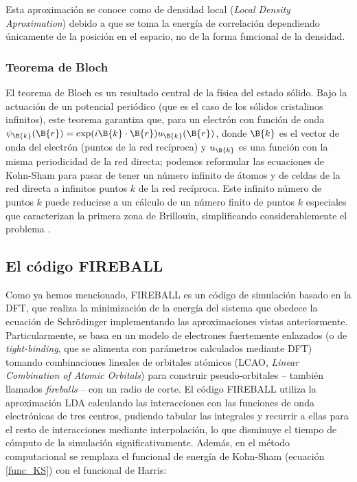 Esta aproximación se conoce como de densidad local (\emph{Local Density Aproximation}) debido a que se toma la energía de correlación dependiendo únicamente de la posición en el espacio, no de la forma funcional de la densidad. 
\subsubsection{Teorema de Bloch}
El teorema de Bloch es un resultado central de la física del estado sólido. Bajo la actuación de un potencial periódico (que es el caso de los sólidos cristalinos infinitos), este teorema garantiza que, para un electrón con función de onda $\psi_\B{k} (\B{r}) = \exp(i\B{k}\cdot \B{r}) u_\B{k}(\B{r})$, donde $\B{k}$ es el vector de onda del electrón (puntos de la red recíproca) y $u_\B{k}$ es una función con la misma periodicidad de la red directa; podemos reformular las ecuaciones de Kohn-Sham para pasar de tener un número infinito de átomos y de celdas de la red directa a infinitos puntos $k$ de la red recíproca. Este infinito número de puntos $k$ puede reducirse a un cálculo de un número finito de puntos $k$ especiales que caracterizan la primera zona de Brillouin, simplificando considerablemente el problema \cite{Baldereschi} \cite{Monkhorst}.
\subsection{El código FIREBALL}
Como ya hemos mencionado, FIREBALL es un código de simulación basado en la DFT, que realiza la minimización de la energía del sistema que obedece la ecuación de Schrödinger implementando las aproximaciones vistas anteriormente. Particularmente, se basa en un modelo de electrones fuertemente enlazados (o de \emph{tight-binding}, que se alimenta con parámetros calculados mediante DFT) tomando combinaciones lineales de orbitales atómicos (LCAO, \emph{Linear Combination of Atomic Orbitals}) para construir pseudo-orbitales -- también llamados \emph{fireballs} -- con un radio de corte. El código FIREBALL utiliza la aproximación LDA calculando las interacciones con las funciones de onda electrónicas de tres centros, pudiendo tabular las integrales y recurrir a ellas para el resto de interacciones mediante interpolación, lo que disminuye el tiempo de cómputo de la simulación significativamente. Además, en el método computacional se remplaza el funcional de energía de Kohn-Sham (ecuación \ref{func_KS}) con el funcional de Harris:

